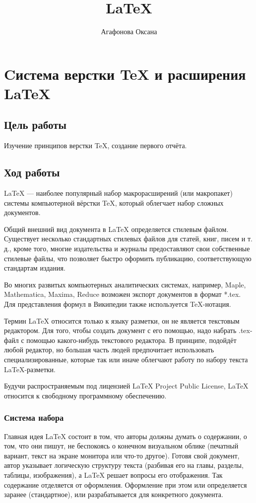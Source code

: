 \documentclass[10pt,a4paper]{article}
\author{Агафонова Оксана}
\title{LaTeX}
\begin{document}
\maketitle
\clearpage
\tableofcontents
\clearpage
\section{Cистема верстки \TeX{} и расширения \LaTeX{}}

\subsection{Цель работы}

\hspace{0,6cm}Изучение принципов верстки \TeX{}, создание первого отчёта.

\subsection{Ход работы}

\hspace{0,6cm}\LaTeX{} --- наиболее популярный набор макрорасширений (или макропакет) системы компьютерной вёрстки \TeX{}, который облегчает набор сложных документов. 

Общий внешний вид документа в LaTeX определяется стилевым файлом. Существует несколько стандартных стилевых файлов для статей, книг, писем и т. д., кроме того, многие издательства и журналы предоставляют свои собственные стилевые файлы, что позволяет быстро оформить публикацию, соответствующую стандартам издания.

Во многих развитых компьютерных аналитических системах, например, Maple, Mathematica, Maxima, Reduce возможен экспорт документов в формат *.tex. Для представления формул в Википедии также используется TeX-нотация.

Термин LaTeX относится только к языку разметки, он не является текстовым редактором. Для того, чтобы создать документ с его помощью, надо набрать .tex-файл с помощью какого-нибудь текстового редактора. В принципе, подойдёт любой редактор, но большая часть людей предпочитает использовать специализированные, которые так или иначе облегчают работу по набору текста LaTeX-разметки.

Будучи распространяемым под лицензией LaTeX Project Public License, LaTeX относится к свободному программному обеспечению.

\subsubsection{Система набора}
\hspace{0,6cm}Главная идея \LaTeX{} состоит в том, что авторы должны думать о содержании, о том, что они пишут, не беспокоясь о конечном визуальном облике (печатный вариант, текст на экране монитора или что-то другое). Готовя свой документ, автор указывает логическую структуру текста (разбивая его на главы, разделы, таблицы, изображения), а LaTeX решает вопросы его отображения. Так содержание отделяется от оформления. Оформление при этом или определяется заранее (стандартное), или разрабатывается для конкретного документа.
\end{document}

